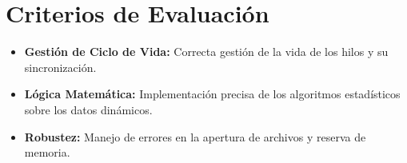 \documentclass[12pt,a4paper]{article}
\begin{document}
\section*{Criterios de Evaluación}
\begin{itemize}
    \item \textbf{Gestión de Ciclo de Vida:} Correcta gestión de la vida de los hilos y su sincronización.
    \item \textbf{Lógica Matemática:} Implementación precisa de los algoritmos estadísticos sobre los datos dinámicos.
    \item \textbf{Robustez:} Manejo de errores en la apertura de archivos y reserva de memoria.
\end{itemize}
\end{document}
